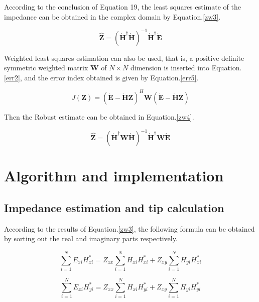 \documentclass[9pt,a4paper,twoside]{rho-class/rho}
\begin{document}
According to the conclusion of Equation 19, the least squares estimate of the impedance can be obtained in the complex domain by Equation.\eqref{zw3}.

\begin{equation}
    \label{zw3}
    \hat{\bm{Z}} = (\dot{\mathbf{H}}^\dagger \dot{\mathbf{H}})^{-1}\dot{\mathbf{H}}^\dagger\dot{\bm{E}}
\end{equation}

Weighted least squares estimation can also be used, that is, a positive definite symmetric weighted matrix $\mathbf{W}$ of $N \times N$ dimension is inserted into Equation.\eqref{err2}, and the error index obtained is given by Equation.\eqref{err5}.

\begin{equation}
    \label{err5}
    J(\bm{Z})=(\dot{\bm{E}}-\dot{\mathbf{H}}\bm{Z})^H\mathbf{W}(\dot{\bm{E}}-\dot{\mathbf{H}}\bm{Z})
\end{equation}

Then the Robust estimate can be obtained in Equation.\eqref{zw4}.

\begin{equation}
    \label{zw4}
    \hat{\bm{Z}}=(\dot{\mathbf{H}}^\dagger \mathbf{W} \dot{\mathbf{H}})^{-1}\dot{\mathbf{H}}^\dagger\mathbf{W}\dot{\bm{E}}
\end{equation}

\section{Algorithm and implementation}

\subsection{Impedance estimation and tip calculation}

According to the results of Equation.\eqref{zw3}, the following formula can be obtained by sorting out the real and imaginary parts respectively.

\begin{equation}
    \label{pow1}
    \sum^N_{i=1}E_{xi}H_{xi}^\ast=Z_{xx}\sum^{N}_{i=1}H_{xi}H_{xi}^\ast+Z_{xy}\sum^N_{i=1}H_{yi}H_{xi}^\ast
\end{equation}

\begin{equation}
    \label{pow2}
    \sum^N_{i=1}E_{xi}H_{yi}^\ast=Z_{xx}\sum^N_{i=1}H_{xi}H_{yi}^\ast+Z_{xy}\sum^N_{i=1}H_{yi}H_{yi}^\ast
\end{equation}
\end{document}
